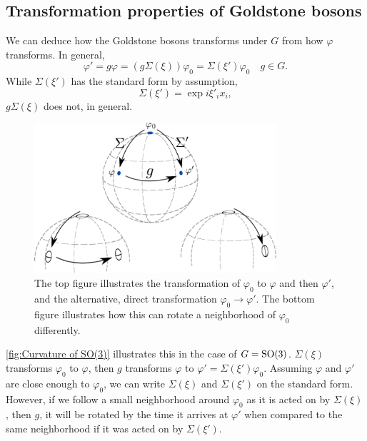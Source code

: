 \subsection{Transformation properties of Goldstone bosons}
We can deduce how the Goldstone bosons transforms under $G$ from how $\varphi$ transforms.
In general, 
\begin{equation}
    \varphi' = g \varphi = (g \Sigma(\xi)) \varphi_0 = \Sigma(\xi') \varphi_0 \quad g \in G.
\end{equation}
%
While $\Sigma(\xi')$ has the standard form by assumption,
\begin{equation}
    \Sigma(\xi') = \exp{i \xi'_i x_i},
\end{equation}
%
$g\Sigma(\xi)$ does not, in general.

\begin{figure}[h]
    \centering
    \includegraphics[width=0.8\textwidth]{figurer/curvature.pdf}
    \caption{The top figure illustrates the transformation of $\varphi_0$ to $\varphi$ and then $\varphi'$, and the alternative, direct transformation $\varphi_0 \rightarrow \varphi'$. The bottom figure illustrates how this can rotate a neighborhood of $\varphi_0$ differently.}
    \label{fig:Curvature of SO(3)}
\end{figure}
\autoref{fig:Curvature of SO(3)} illustrates this in the case of $G = \text{SO}(3)$.
$\Sigma(\xi)$ transforms $\varphi_0$ to $\varphi$, then $g$ transforms $\varphi$ to $\varphi' = \Sigma(\xi') \varphi_0$.
Assuming $\varphi$ and $\varphi'$ are close enough to $\varphi_0$, we can write $\Sigma(\xi)$ and $\Sigma(\xi')$ on the standard form.
However, if we follow a small neighborhood around $\varphi_0$ as it is acted on by $\Sigma(\xi)$, then $g$, it will be rotated by the time it arrives at $\varphi'$ when compared to the same neighborhood if it was acted on by $\Sigma(\xi')$.

